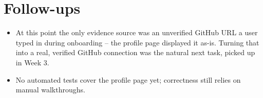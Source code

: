 \documentclass[11pt,a4paper]{article}
\begin{document}
\section{Follow-ups}
\begin{itemize}[leftmargin=0.7cm]
  \item At this point the only evidence source was an unverified
    GitHub URL a user typed in during onboarding -- the profile
    page displayed it as-is. Turning that into a real, verified
    GitHub connection was the natural next task, picked up in
    Week 3.
  \item No automated tests cover the profile page yet; correctness
    still relies on manual walkthroughs.
\end{itemize}
\end{document}
